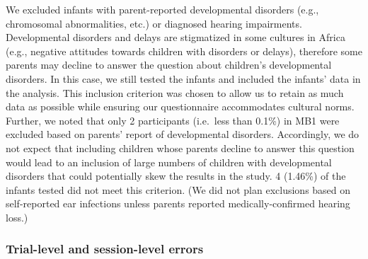 \documentclass[
  ,man,floatsintext]{apa6}
\begin{document}
We excluded infants with parent-reported developmental disorders (e.g., chromosomal abnormalities, etc.) or diagnosed hearing impairments. Developmental disorders and delays are stigmatized in some cultures in Africa (e.g., negative attitudes towards children with disorders or delays), therefore some parents may decline to answer the question about children's developmental disorders. In this case, we still tested the infants and included the infants' data in the analysis. This inclusion criterion was chosen to allow us to retain as much data as possible while ensuring our questionnaire accommodates cultural norms. Further, we noted that only 2 participants (i.e.~less than 0.1\%) in MB1 were excluded based on parents' report of developmental disorders. Accordingly, we do not expect that including children whose parents decline to answer this question would lead to an inclusion of large numbers of children with developmental disorders that could potentially skew the results in the study. 4 (1.46\%) of the infants tested did not meet this criterion. (We did not plan exclusions based on self-reported ear infections unless parents reported medically-confirmed hearing loss.)

\hypertarget{trial-level-and-session-level-errors}{%
\subsubsection{Trial-level and session-level errors}\label{trial-level-and-session-level-errors}}
\end{document}
